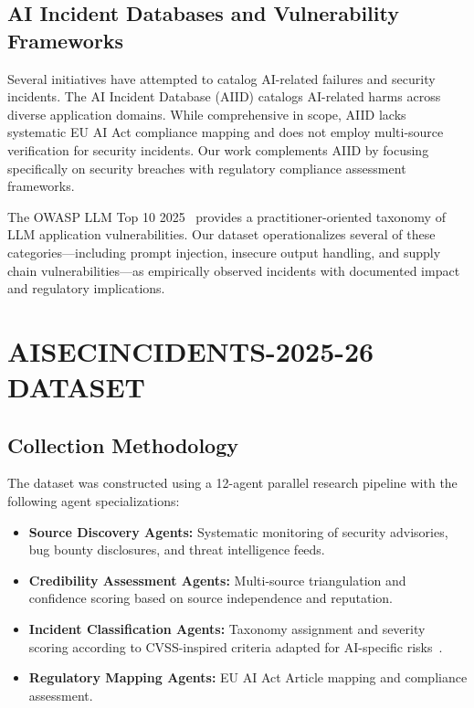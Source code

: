 \documentclass[10pt,conference]{IEEEtran}
\begin{document}
\subsection{AI Incident Databases and Vulnerability Frameworks}

Several initiatives have attempted to catalog AI-related failures and security incidents. The AI Incident Database (AIID) catalogs AI-related harms across diverse application domains. While comprehensive in scope, AIID lacks systematic EU AI Act compliance mapping and does not employ multi-source verification for security incidents. Our work complements AIID by focusing specifically on security breaches with regulatory compliance assessment frameworks.

The OWASP LLM Top 10 2025~\cite{owasp_llm2025} provides a practitioner-oriented taxonomy of LLM application vulnerabilities. Our dataset operationalizes several of these categories---including prompt injection, insecure output handling, and supply chain vulnerabilities---as empirically observed incidents with documented impact and regulatory implications.

\section{AISECINCIDENTS-2025-26 DATASET}
\label{sec:dataset}

\subsection{Collection Methodology}

The dataset was constructed using a 12-agent parallel research pipeline with the following agent specializations:

\begin{itemize}
    \item \textbf{Source Discovery Agents:} Systematic monitoring of security advisories, bug bounty disclosures, and threat intelligence feeds.
    \item \textbf{Credibility Assessment Agents:} Multi-source triangulation and confidence scoring based on source independence and reputation.
    \item \textbf{Incident Classification Agents:} Taxonomy assignment and severity scoring according to CVSS-inspired criteria adapted for AI-specific risks~\cite{first2019cvss}.
    \item \textbf{Regulatory Mapping Agents:} EU AI Act Article mapping and compliance assessment.
\end{itemize}
\end{document}
